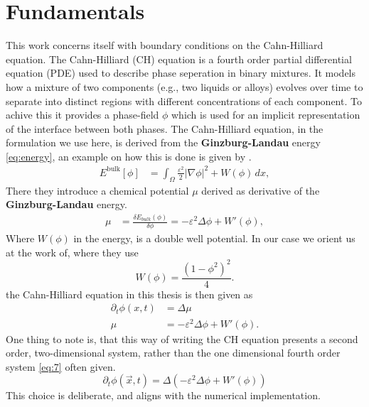 \documentclass{mimosis}
\begin{document}
\chapter{Fundamentals}
\label{sec:orgcdba1fd}
This work concerns itself with boundary conditions on the Cahn-Hilliard equation. The Cahn-Hilliard (CH) equation is a fourth order partial differential equation (PDE) used to describe phase seperation in binary mixtures. It models how a mixture of two components (e.g., two liquids or alloys) evolves over time to separate into distinct regions with different concentrations of each component. To achive this it provides a phase-field \(\phi\) which is used for an implicit representation of the interface between both phases. The Cahn-Hilliard equation, in the formulation we use here, is derived from the \textbf{Ginzburg-Landau} energy \eqref{eq:energy}, an example on how this is done is given by \autocite{Wu_2022}.
\begin{align}
\label{eq:energy}
E^{\text{bulk}}[\phi] &= \int_{\Omega} \frac{\varepsilon^2}{2} |\nabla \phi |^2 + W(\phi) \, dx ,
\end{align}
There they introduce a chemical potential \(\mu\) derived as derivative of the \textbf{Ginzburg-Landau} energy.
\begin{align}
\label{eq:chemical-potential}
 \mu &= \frac{\delta E_{bulk}(\phi)}{\delta \phi} = -\varepsilon^2 \Delta \phi + W'(\phi),
\end{align}
Where \(W(\phi)\) in the energy, is a double well potential. In our case we orient us at the work of\autocite{SHIN20117441}, where they use
\begin{equation}
\label{eq:6}
W(\phi) = \frac{(1-\phi^2)^2}{4}.
\end{equation}
the Cahn-Hilliard equation in this thesis is then given as
\begin{equation}
\begin{aligned}
\partial_{t}\phi(x,t) &=  \Delta\mu \\
\mu &= - \varepsilon^2 \Delta\phi  + W'(\phi).
\end{aligned}
\end{equation}
One thing to note is, that this way of writing the CH equation presents a second order, two-dimensional system, rather than the one dimensional fourth order system \eqref{eq:7} often given.
\begin{equation}
\label{eq:7}
\partial_t \phi(\vec{x} , t) = \Delta(-\varepsilon^2  \Delta \phi + W\prime(\phi))
\end{equation}
This choice is deliberate, and aligns with the numerical implementation.
\end{document}
